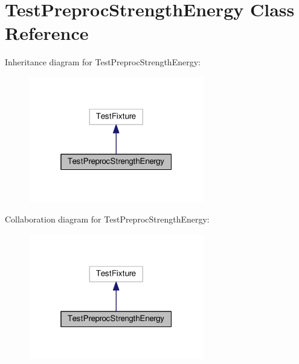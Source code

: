 \hypertarget{class_test_preproc_strength_energy}{}\section{Test\+Preproc\+Strength\+Energy Class Reference}
\label{class_test_preproc_strength_energy}


Inheritance diagram for Test\+Preproc\+Strength\+Energy\+:
\nopagebreak
\begin{figure}[H]
\begin{center}
\leavevmode
\includegraphics[width=217pt]{class_test_preproc_strength_energy__inherit__graph}
\end{center}
\end{figure}


Collaboration diagram for Test\+Preproc\+Strength\+Energy\+:
\nopagebreak
\begin{figure}[H]
\begin{center}
\leavevmode
\includegraphics[width=217pt]{class_test_preproc_strength_energy__coll__graph}
\end{center}
\end{figure}
